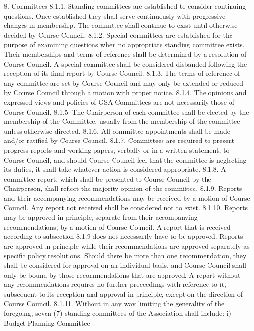 \documentclass{article}
\begin{document}
8. Committees 
8.1.1. Standing committees are established to consider continuing questions. 
Once established they shall serve continuously with progressive 
changes in membership. The committee shall continue to exist until 
otherwise decided by Course Council. 
8.1.2. Special committees are established for the purpose of examining 
questions when no appropriate standing committee exists. Their 
memberships and terms of reference shall be determined by a 
resolution of Course Council. A special committee shall be considered 
disbanded following the reception of its final report by Course 
Council. 
8.1.3. The terms of reference of any committee are set by Course Council 
and may only be extended or reduced by Course Council through a 
motion with proper notice. 
8.1.4. The opinions and expressed views and policies of GSA Committees 
are not necessarily those of Course Council. 
8.1.5. The Chairperson of each committee shall be elected by the 
membership of the Committee, usually from the membership of the 
committee unless otherwise directed. 
8.1.6. All committee appointments shall be made and/or ratified by Course 
Council. 
8.1.7. Committees are required to present progress reports and working 
papers, verbally or in a written statement, to Course Council, and 
should Course Council feel that the committee is neglecting its duties, 
it shall take whatever action is considered appropriate. 
8.1.8. A committee report, which shall be presented to Course Council by the 
Chairperson, shall reflect the majority opinion of the committee. 
8.1.9. Reports and their accompanying recommendations may be received by 
a motion of Course Council. Any report not received shall be 
considered not to exist. 
8.1.10. Reports may be approved in principle, separate from their 
accompanying recommendations, by a motion of Course Council. A 
report that is received according to subsection 8.1.9 does not 
necessarily have to be approved. Reports are approved in principle 
while their recommendations are approved separately as specific 
policy resolutions. Should there be more than one recommendation, 
they shall be considered for approval on an individual basis, and 
Course Council shall only be bound by those recommendations that 
are approved. A report without any recommendations requires no 
further proceedings with reference to it, subsequent to its reception and 
approval in principle, except on the direction of Course Council. 
8.1.11. Without in any way limiting the generality of the foregoing, seven 
(7) standing committees of the Association shall include: 
i) Budget Planning Committee 
\end{document}
